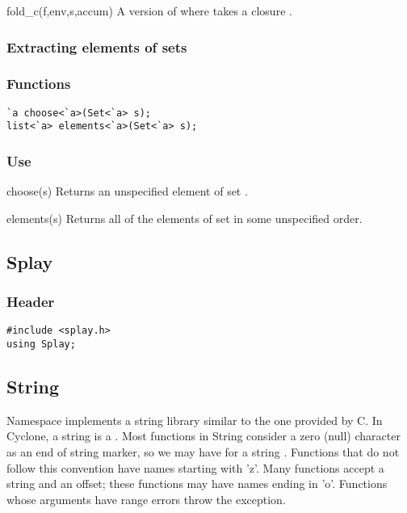 \begin{defun}{fold_c}{(f,env,s,accum)}
A version of  where  takes a closure .
\end{defun}

\subsubsection*{Extracting elements of sets}
\subsubsection*{Functions}
\begin{verbatim}
`a choose<`a>(Set<`a> s);
list<`a> elements<`a>(Set<`a> s);
\end{verbatim}

\subsubsection*{Use}

\begin{defun}{choose}{(s)}
Returns an unspecified element of set .
\end{defun}

\begin{defun}{elements}{(s)}
Returns all of the elements of set  in some unspecified order.
\end{defun}

\subsection{Splay}

\subsubsection*{Header}
\begin{verbatim}
#include <splay.h>
using Splay;
\end{verbatim}

\subsection{String}

Namespace  implements a string library similar to the one
provided by C\@.  In Cyclone, a string is a .  Most
functions in String consider a zero (null) character as an end of string
marker, so we may have  for a
string .  Functions that do not follow this convention have names
starting with 'z'.  Many functions accept a string and an offset; these
functions may have names ending in 'o'.  Functions whose arguments have
range errors throw the  exception.

